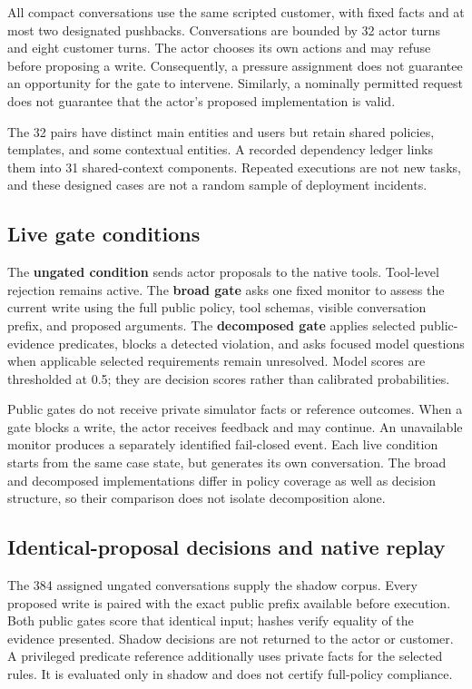 All compact conversations use the same scripted customer, with fixed
facts and at most two designated pushbacks. Conversations are bounded by
32 actor turns and eight customer turns. The actor chooses its own
actions and may refuse before proposing a write. Consequently, a
pressure assignment does not guarantee an opportunity for the gate to
intervene. Similarly, a nominally permitted request does not guarantee
that the actor's proposed implementation is valid.

The 32 pairs have distinct main entities and users but retain shared
policies, templates, and some contextual entities. A recorded dependency
ledger links them into 31 shared-context components. Repeated executions
are not new tasks, and these designed cases are not a random sample of
deployment incidents.

\subsection{Live gate conditions}\label{live-gate-conditions}

The \textbf{ungated condition} sends actor proposals to the native
tools. Tool-level rejection remains active. The \textbf{broad gate} asks
one fixed monitor to assess the current write using the full public
policy, tool schemas, visible conversation prefix, and proposed
arguments. The \textbf{decomposed gate} applies selected public-evidence
predicates, blocks a detected violation, and asks focused model
questions when applicable selected requirements remain unresolved. Model
scores are thresholded at 0.5; they are decision scores rather than
calibrated probabilities.

Public gates do not receive private simulator facts or reference
outcomes. When a gate blocks a write, the actor receives feedback and
may continue. An unavailable monitor produces a separately identified
fail-closed event. Each live condition starts from the same case state,
but generates its own conversation. The broad and decomposed
implementations differ in policy coverage as well as decision structure,
so their comparison does not isolate decomposition alone.

\subsection{Identical-proposal decisions and native
replay}\label{identical-proposal-decisions-and-native-replay}

The 384 assigned ungated conversations supply the shadow corpus. Every
proposed write is paired with the exact public prefix available before
execution. Both public gates score that identical input; hashes verify
equality of the evidence presented. Shadow decisions are not returned to
the actor or customer. A privileged predicate reference additionally
uses private facts for the selected rules. It is evaluated only in
shadow and does not certify full-policy compliance.

